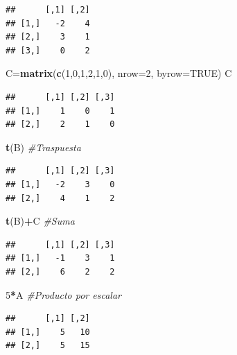 \documentclass[]{book}
\newenvironment{Shaded}{\begin{snugshade}}{\end{snugshade}}
\newcommand{\CommentTok}[1]{\textcolor[rgb]{0.56,0.35,0.01}{\textit{#1}}}
\newcommand{\DataTypeTok}[1]{\textcolor[rgb]{0.13,0.29,0.53}{#1}}
\newcommand{\DecValTok}[1]{\textcolor[rgb]{0.00,0.00,0.81}{#1}}
\newcommand{\KeywordTok}[1]{\textcolor[rgb]{0.13,0.29,0.53}{\textbf{#1}}}
\newcommand{\NormalTok}[1]{#1}
\newcommand{\OperatorTok}[1]{\textcolor[rgb]{0.81,0.36,0.00}{\textbf{#1}}}
\newcommand{\OtherTok}[1]{\textcolor[rgb]{0.56,0.35,0.01}{#1}}
\theoremstyle{definition}
\theoremstyle{definition}
\theoremstyle{definition}
\theoremstyle{remark}
\begin{document}
\begin{verbatim}
##      [,1] [,2]
## [1,]   -2    4
## [2,]    3    1
## [3,]    0    2
\end{verbatim}

\begin{Shaded}
\begin{Highlighting}[]
\NormalTok{C=}\KeywordTok{matrix}\NormalTok{(}\KeywordTok{c}\NormalTok{(}\DecValTok{1}\NormalTok{,}\DecValTok{0}\NormalTok{,}\DecValTok{1}\NormalTok{,}\DecValTok{2}\NormalTok{,}\DecValTok{1}\NormalTok{,}\DecValTok{0}\NormalTok{), }\DataTypeTok{nrow=}\DecValTok{2}\NormalTok{, }\DataTypeTok{byrow=}\OtherTok{TRUE}\NormalTok{)}
\NormalTok{C}
\end{Highlighting}
\end{Shaded}

\begin{verbatim}
##      [,1] [,2] [,3]
## [1,]    1    0    1
## [2,]    2    1    0
\end{verbatim}

\begin{Shaded}
\begin{Highlighting}[]
\KeywordTok{t}\NormalTok{(B) }\CommentTok{#Traspuesta}
\end{Highlighting}
\end{Shaded}

\begin{verbatim}
##      [,1] [,2] [,3]
## [1,]   -2    3    0
## [2,]    4    1    2
\end{verbatim}

\begin{Shaded}
\begin{Highlighting}[]
\KeywordTok{t}\NormalTok{(B)}\OperatorTok{+}\NormalTok{C }\CommentTok{#Suma}
\end{Highlighting}
\end{Shaded}

\begin{verbatim}
##      [,1] [,2] [,3]
## [1,]   -1    3    1
## [2,]    6    2    2
\end{verbatim}

\begin{Shaded}
\begin{Highlighting}[]
\DecValTok{5}\OperatorTok{*}\NormalTok{A }\CommentTok{#Producto por escalar}
\end{Highlighting}
\end{Shaded}

\begin{verbatim}
##      [,1] [,2]
## [1,]    5   10
## [2,]    5   15
\end{verbatim}
\end{document}
